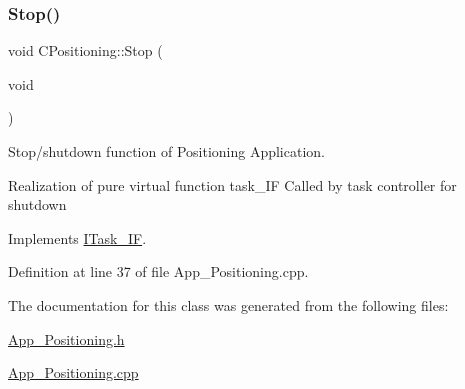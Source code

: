\subsubsection{\texorpdfstring{Stop()}{Stop()}}
{\footnotesize\ttfamily void C\+Positioning\+::\+Stop (\begin{DoxyParamCaption}\item[{void}]{ }\end{DoxyParamCaption})\hspace{0.3cm}{\ttfamily [virtual]}}



Stop/shutdown function of Positioning Application. 

Realization of pure virtual function task\+\_\+\+IF Called by task controller for shutdown 

Implements \mbox{\hyperlink{class_i_task___i_f_af5f8fba86704c7e36d0e4681d58300c6}{I\+Task\+\_\+\+IF}}.



Definition at line 37 of file App\+\_\+\+Positioning.\+cpp.



The documentation for this class was generated from the following files\+:\begin{DoxyCompactItemize}
\item 
\mbox{\hyperlink{_app___positioning_8h}{App\+\_\+\+Positioning.\+h}}\item 
\mbox{\hyperlink{_app___positioning_8cpp}{App\+\_\+\+Positioning.\+cpp}}\end{DoxyCompactItemize}
